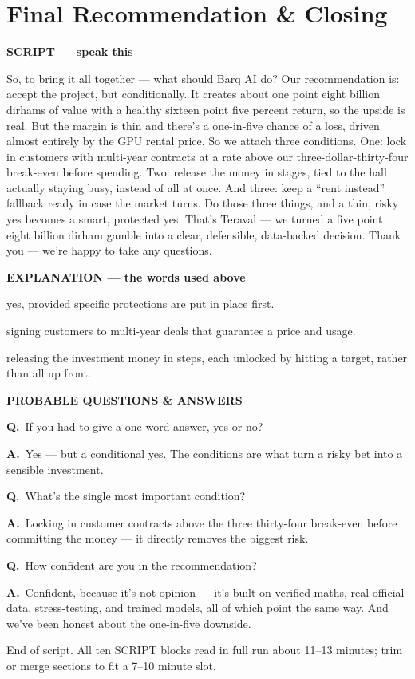 \documentclass[12pt,a4paper]{article}
\newcommand{\block}[2]{\par\medskip\noindent\textcolor{#1}{\textbf{#2}}\par\nobreak\smallskip}
\newcommand{\SC}{\block{tvblue}{SCRIPT --- speak this}}
\newcommand{\EX}{\block{tvgreen}{EXPLANATION --- the words used above}}
\newcommand{\PQ}{\block{tvamber}{PROBABLE QUESTIONS \& ANSWERS}}
\newcommand{\qa}[2]{\par\noindent\textbf{Q.}~#1\par\noindent\textbf{A.}~#2\par\smallskip}
\newenvironment{terms}{\begin{description}[leftmargin=0pt,itemsep=2pt,font=\normalfont\bfseries]}{\end{description}}
\begin{document}
\section{Final Recommendation \& Closing}

\SC
So, to bring it all together --- what should Barq AI do? Our recommendation is: accept the project, but
conditionally. It creates about one point eight billion dirhams of value with a healthy sixteen point
five percent return, so the upside is real. But the margin is thin and there's a one-in-five chance of
a loss, driven almost entirely by the GPU rental price. So we attach three conditions. One: lock in
customers with multi-year contracts at a rate above our three-dollar-thirty-four break-even before
spending. Two: release the money in stages, tied to the hall actually staying busy, instead of all at
once. And three: keep a ``rent instead'' fallback ready in case the market turns. Do those three
things, and a thin, risky yes becomes a smart, protected yes. That's Teraval --- we turned a five point
eight billion dirham gamble into a clear, defensible, data-backed decision. Thank you --- we're happy
to take any questions.

\EX
\begin{terms}
  \item[Conditional accept:] yes, provided specific protections are put in place first.
  \item[Contracted offtake:] signing customers to multi-year deals that guarantee a price and usage.
  \item[Staged capex:] releasing the investment money in steps, each unlocked by hitting a target,
  rather than all up front.
\end{terms}

\PQ
\qa{If you had to give a one-word answer, yes or no?}{Yes --- but a conditional yes. The conditions are
what turn a risky bet into a sensible investment.}
\qa{What's the single most important condition?}{Locking in customer contracts above the three
thirty-four break-even before committing the money --- it directly removes the biggest risk.}
\qa{How confident are you in the recommendation?}{Confident, because it's not opinion --- it's built on
verified maths, real official data, stress-testing, and trained models, all of which point the same
way. And we've been honest about the one-in-five downside.}

\vspace{1em}
\begin{center}\small\textcolor{tvgrey}{%
End of script. All ten SCRIPT blocks read in full run about 11--13 minutes; trim or merge sections to
fit a 7--10 minute slot.}\end{center}
\end{document}
